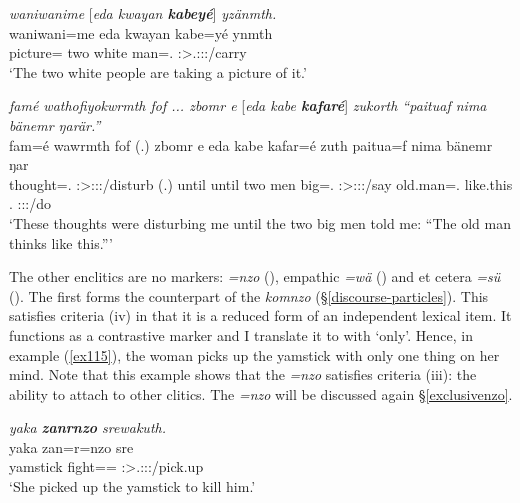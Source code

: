 \begin{exe}
	\ex \emph{waniwanime} [\emph{eda kwayan \textbf{kabeyé}}] \emph{yzänmth.}\\
	\gll waniwani=me eda kwayan {kabe=yé} ynmth\\
	picture={\Ins} two white man=\Erg.{\Nsg} \Stdu:\Sbj>\Tsg.\Masc:\Obj:\Nonpast:\Ipfv/carry\\
	\trans `The two white people are taking a picture of it.' 
	\label{ex498}
\end{exe}
\begin{exe}
	\ex \emph{famé wathofiyokwrmth fof ... zbomr e} [\emph{eda kabe \textbf{kafaré}}]\emph{ zukorth ``paituaf nima bänemr ŋarär.''}\\
	\gll fam=é wawrmth fof (.) zbomr e eda kabe kafar=é zuth paitua=f nima bänemr ŋar\\
	thought=\Erg.{\Nsg} \Stpl:\Sbj>\Fsg:\Obj:\Rpst:\Dur/disturb {\Emph} (.) until until two men big=\Erg.{\Nsg} \Stdu:\Sbj>\Fsg:\Obj:\Rpst:\Pfv/say {old.man=\Erg.\Sg} {like.this} \Recog.{\Purp} \Stsg:\Sbj:\Nonpast:\Ipfv/do\\
	\trans `These thoughts were disturbing me until the two big men told me: ``The old man thinks like this.''' 
	\label{ex499}
\end{exe}

The other  enclitics are no  markers:  \emph{=nzo} (\Only), empathic \emph{=wä} (\Emph) and et cetera \emph{=sü} (\Etc). The first forms the  counterpart of the  \emph{komnzo} ({\S}\ref{discourse-particles}). This  satisfies criteria (iv) in that it is a reduced form of an independent lexical item. It functions as a contrastive  marker and I translate it to with  `only'. Hence, in example (\ref{ex115}), the woman picks up the yamstick with only one thing on her mind. Note that this example shows that the  \emph{=nzo} satisfies criteria (iii): the ability to attach to other clitics. The   \emph{=nzo} will be discussed again {\S}\ref{exclusivenzo}.

\begin{exe}
	\ex \emph{yaka \textbf{zanrnzo} srewakuth.}\\
	\gll yaka zan=r=nzo sre\\
	yamstick fight={\Purp}={\Only} \Stsg:\Sbj>\Tsg.\Masc:\Obj:\Irr:\Pfv/pick.up\\
	\trans `She picked up the yamstick to kill him.' 
	\label{ex115}
\end{exe}


